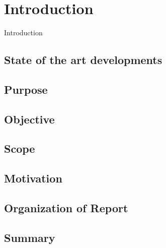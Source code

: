 \chapter{Introduction}

Introduction

\section{State of the art developments}

\section{Purpose}

\section{Objective}

\section{Scope}

\section{Motivation}

\section{Organization of Report}

\section{Summary}
